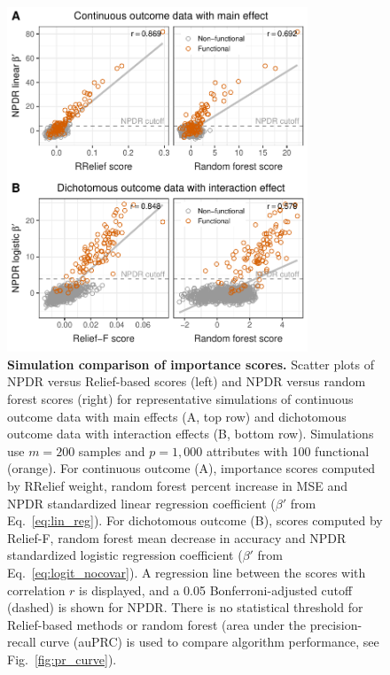 \documentclass[10pt]{article}
\begin{document}
\begin{figure}[!tbp]
\centerline{\includegraphics[trim = 0 0 0 0, width=0.8\textwidth]{../figs/fig1.pdf}}
\caption{{\bf Simulation comparison of importance scores.} Scatter plots of NPDR versus Relief-based scores (left) and NPDR versus random forest scores (right) for representative simulations of continuous outcome data with main effects (A, top row) and dichotomous outcome data with interaction effects (B, bottom row). Simulations use $m = 200$ samples and $p = 1,000$ attributes with 100 functional (orange). For continuous outcome (A), importance scores computed by RRelief weight, random forest percent increase in MSE and NPDR standardized linear regression coefficient ($\beta'$ from Eq.~\ref{eq:lin_reg}). For dichotomous outcome (B), scores computed by Relief-F, random forest mean decrease in accuracy and NPDR standardized logistic regression coefficient ($\beta'$ from Eq.~\ref{eq:logit_nocovar}). A regression line between the scores with correlation $r$ is displayed, and a 0.05 Bonferroni-adjusted cutoff (dashed) is shown for NPDR. There is no statistical threshold for Relief-based methods or random forest (area under the precision-recall curve (auPRC) is used to compare algorithm performance, see Fig.~\ref{fig:pr_curve}).}
\label{fig:npdr_relief}
\end{figure}
\end{document}
